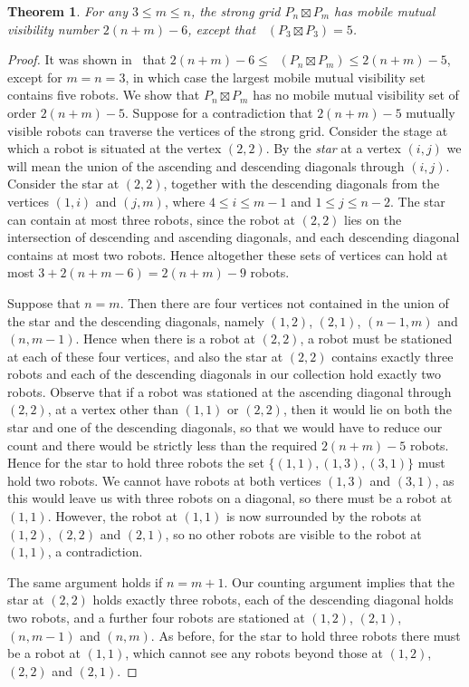 \documentclass[a4paper,12pt]{article}
\DeclareMathOperator{\mobmv}{Mob_{\mu}}
\newtheorem{theorem}{Theorem}[section]
\theoremstyle{definition}
\begin{document}
	\begin{theorem}
		For any $3 \leq m \leq n$, the strong grid $P_n \boxtimes P_m$ has mobile mutual visibility number $2(n+m)-6$, except that $\mobmv (P_3 \boxtimes P_3) = 5$.
	\end{theorem}
	\begin{proof}
		It was shown in~\cite{dettlaff2024} that $2(n+m)-6 \leq \mobmv (P_n \boxtimes P_m) \leq 2(n+m)-5$, except for $m = n = 3$, in which case the largest mobile mutual visibility set contains five robots. We show that $P_n \boxtimes P_m$ has no mobile mutual visibility set of order $2(n+m)-5$. Suppose for a contradiction that $2(n+m)-5$ mutually visible robots can traverse the vertices of the strong grid. Consider the stage at which a robot is situated at the vertex $(2,2)$. By the \emph{star} at a vertex $(i,j)$ we will mean the union of the ascending and descending diagonals through $(i,j)$. Consider the star at $(2,2)$, together with the descending diagonals from the vertices $(1,i)$ and $(j,m)$, where $4 \leq i \leq m-1$ and $1 \leq j \leq n-2$. The star can contain at most three robots, since the robot at $(2,2)$ lies on the intersection of descending and ascending diagonals, and each descending diagonal contains at most two robots. Hence altogether these sets of vertices can hold at most $3+2(n+m-6) = 2(n+m)-9$ robots.  
		
		Suppose that $n = m$. Then there are four vertices not contained in the union of the star and the descending diagonals, namely $(1,2)$, $(2,1)$, $(n-1,m)$ and $(n,m-1)$. Hence when there is a robot at $(2,2)$, a robot must be stationed at each of these four vertices, and also the star at $(2,2)$ contains exactly three robots and each of the descending diagonals in our collection hold exactly two robots. Observe that if a robot was stationed at the ascending diagonal through $(2,2)$, at a vertex other than $(1,1)$ or $(2,2)$, then it would lie on both the star and one of the descending diagonals, so that we would have to reduce our count and there would be strictly less than the required $2(n+m)-5$ robots. Hence for the star to hold three robots the set $\{ (1,1),(1,3),(3,1) \}$ must hold two robots. We cannot have robots at both vertices $(1,3)$ and $(3,1)$, as this would leave us with three robots on a diagonal, so there must be a robot at $(1,1)$. However, the robot at $(1,1)$ is now surrounded by the robots at $(1,2)$, $(2,2)$ and $(2,1)$, so no other robots are visible to the robot at $(1,1)$, a contradiction. 
		
		The same argument holds if $n = m+1$. Our counting argument implies that the star at $(2,2)$ holds exactly three robots, each of the descending diagonal holds two robots, and a further four robots are stationed at $(1,2)$, $(2,1)$, $(n,m-1)$ and $(n,m)$. As before, for the star to hold three robots there must be a robot at $(1,1)$, which cannot see any robots beyond those at $(1,2)$, $(2,2)$ and $(2,1)$.
		

\end{proof}
\end{document}
